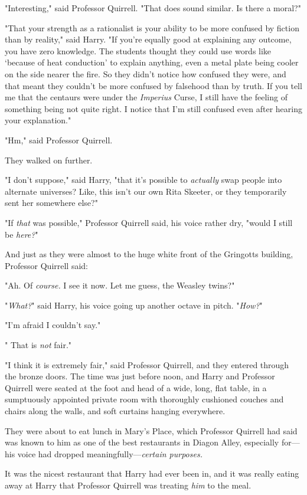 "Interesting," said Professor Quirrell. "That does sound similar. Is there a
moral?"

"That your strength as a rationalist is your ability to be more confused by
fiction than by reality," said Harry. "If you're equally good at explaining any
outcome, you have zero knowledge. The students thought they could use words
like `because of heat conduction' to explain anything, even a metal plate being
cooler on the side nearer the fire. So they didn't notice how confused they
were, and that meant they couldn't be more confused by falsehood than by truth.
If you tell me that the centaurs were under the \emph{Imperius} Curse, I still
have the feeling of something being not quite right. I notice that I'm still
confused even after hearing your explanation."

"Hm," said Professor Quirrell.

They walked on further.

"I don't suppose," said Harry, "that it's possible to \emph{actually} swap
people into alternate universes? Like, this isn't our own Rita Skeeter, or they
temporarily sent her somewhere else?"

"If \emph{that} was possible," Professor Quirrell said, his voice rather dry,
"would I still be \emph{here?}"

And just as they were almost to the huge white front of the Gringotts building,
Professor Quirrell said:

"Ah. Of \emph{course.} I see it now. Let me guess, the Weasley twins?"

"\emph{What?}" said Harry, his voice going up another octave in pitch.
"\emph{How?}"

"I'm afraid I couldn't say."

"{\el} That is \emph{not} fair."

"I think it is extremely fair," said Professor Quirrell, and they entered
through the bronze doors.
\sbreak
The time was just before noon, and Harry and Professor Quirrell were seated at
the foot and head of a wide, long, flat table, in a sumptuously appointed
private room with thoroughly cushioned couches and chairs along the walls, and
soft curtains hanging everywhere.

They were about to eat lunch in Mary's Place, which Professor Quirrell had said
was known to him as one of the best restaurants in Diagon Alley, especially
for---his voice had dropped meaningfully---\emph{certain purposes.}

It was the nicest restaurant that Harry had ever been in, and it was really
eating away at Harry that Professor Quirrell was treating \emph{him} to the
meal.

